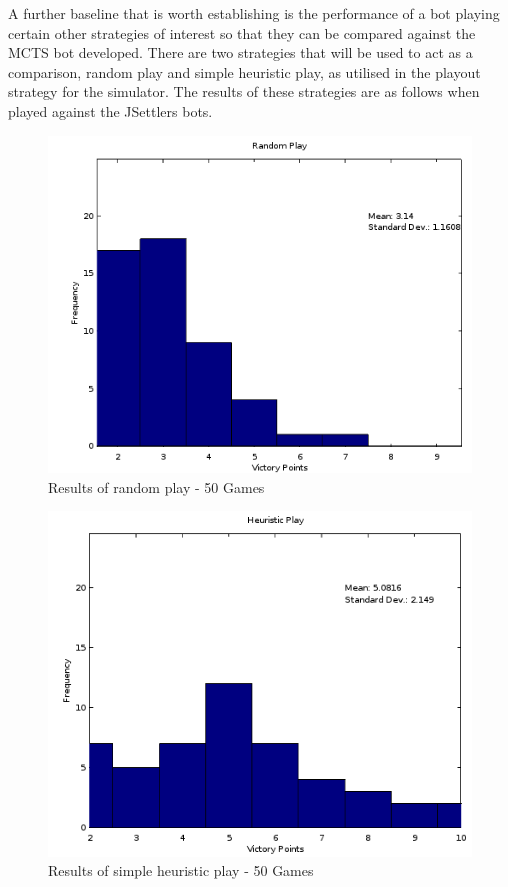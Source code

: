 \documentclass[]{article}
\begin{document}
\par A further baseline that is worth establishing is the performance of a bot playing certain other strategies of interest so that they can be compared against the MCTS bot developed. There are two strategies that will be used to act as a comparison, random play and simple heuristic play, as utilised in the playout strategy for the simulator. The results of these strategies are as follows when played against the JSettlers bots.

\begin{center}
\begin{figure}[H]
 \centerline{\includegraphics[width=0.75\linewidth]{figures/random.png}}
  \caption{Results of random play - 50 Games}
  \label{fig:random1} 
\end{figure}

\begin{figure}[H]
 \centerline{\includegraphics[width=0.75\linewidth]{figures/heuristic.png}}
  \caption{Results of simple heuristic play - 50 Games}
  \label{fig:heuristic1} 
\end{figure}
\end{center}
\end{document}

